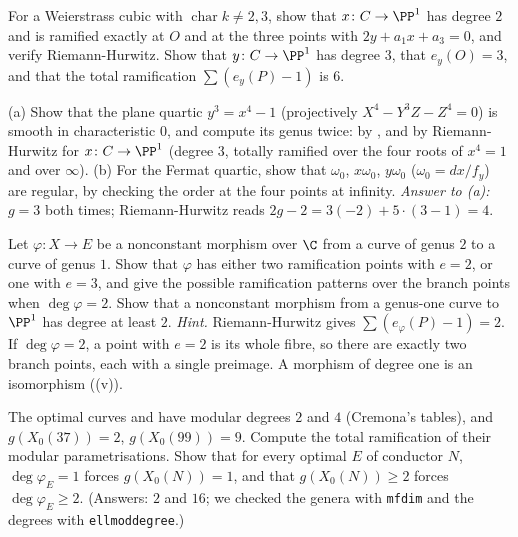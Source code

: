 \begin{exercise}\label{ex:curves:ex-xy}
For a Weierstrass cubic with $\operatorname{char}k\ne2,3$, show that $x\colon C\to\PP^1$ has degree $2$ and is ramified exactly at $O$ and at the three points with $2y+a_1x+a_3=0$, and verify
Riemann-Hurwitz. Show that $y\colon C\to\PP^1$ has degree $3$, that $e_y(O)=3$, and that the total ramification $\sum(e_y(P)-1)$ is $6$.
\end{exercise}

\begin{exercise}\label{ex:curves:ex-quartic}
(a) Show that the plane quartic $y^3=x^4-1$ (projectively $X^4-Y^3Z-Z^4=0$) is smooth in characteristic $0$, and compute its genus twice: by , and by
Riemann-Hurwitz for $x\colon C\to\PP^1$ (degree $3$, totally ramified over the four roots of $x^4=1$ and over $\infty$). (b) For the Fermat quartic, show that $\omega_0$, $x\omega_0$, $y\omega_0$
($\omega_0=dx/f_y$) are regular, by checking the order at the four points at infinity. \emph{Answer to (a):} $g=3$ both times; Riemann-Hurwitz reads
$2g-2=3(-2)+5\cdot(3-1)=4$.
\end{exercise}

\begin{exercise}\label{ex:curves:ex-genus2}
Let $\varphi\colon X\to E$ be a nonconstant morphism over $\C$ from a curve of genus $2$ to a curve of genus $1$. Show that $\varphi$ has either two ramification points with $e=2$, or one with $e=3$,
and give the possible ramification patterns over the branch points when $\deg\varphi=2$. Show that a nonconstant morphism from a genus-one curve to $\PP^1$ has degree at least $2$.
\emph{Hint.} Riemann-Hurwitz gives $\sum(e_\varphi(P)-1)=2$. If $\deg\varphi=2$, a point with $e=2$ is its whole fibre, so there are exactly two branch points, each
with a single preimage. A morphism of degree one is an isomorphism ((v)).
\end{exercise}

\begin{exercise}\label{ex:curves:ex-degrees}
The optimal curves  and  have modular degrees $2$ and $4$ (Cremona's tables), and $g(X_0(37))=2$, $g(X_0(99))=9$. Compute the total ramification of their modular
parametrisations. Show that for every optimal $E$ of conductor $N$, $\deg\varphi_E=1$ forces $g(X_0(N))=1$, and that $g(X_0(N))\ge2$ forces $\deg\varphi_E\ge2$.
(Answers: $2$ and $16$; we checked the genera with \texttt{mfdim} and the degrees with \texttt{ellmoddegree}.)
\end{exercise}

